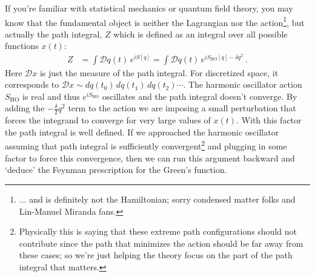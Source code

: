 \documentclass[
  11pt,
	colorful,
	raggedright,
]{tufte-style-thesis-flip}
\begin{document}
If you're familiar with statistical mechanics or quantum field theory, you may know that the fundamental object is neither the Lagrangian nor the action\footnote{... and is definitely not the Hamiltonian; sorry condensed matter folks and Lin-Manuel Miranda fans.}, but actually the path integral, $Z$ which is defined as an integral over all possible functions $x(t)$:
\begin{align}
  Z &= 
  \int \mathcal Dq(t) \, e^{iS[q]}
  = 
  \int \mathcal Dq(t) \, e^{iS_\text{HO}[q] - \delta q^2} \ .
\end{align}
Here $\mathcal Dx$ is just the measure of the path integral. For discretized space, it corresponds to $\mathcal Dx\sim dq(t_0)\,dq(t_1)\, dq(t_2)\cdots$. The harmonic oscillator action $S_\text{HO}$ is real and thus $e^{iS_\text{HO}}$ oscillates and the path integral doesn't converge. By adding the $- \frac{\delta}{2} q^2$ term to the action we are imposing a small perturbation that forces the integrand to converge for very large values of $x(t)$. With this factor the path integral is well defined. If we approached the harmonic oscillator assuming that path integral is sufficiently convergent\footnote{Physically this is saying that these extreme path configurations should not contribute since the path that minimizes the action should be far away from these cases; so we're just helping the theory focus on the part of the path integral that matters.} and plugging in some factor to force this convergence, then we can run this argument backward and `deduce' the Feynman prescription for the Green's function.
\end{document}

